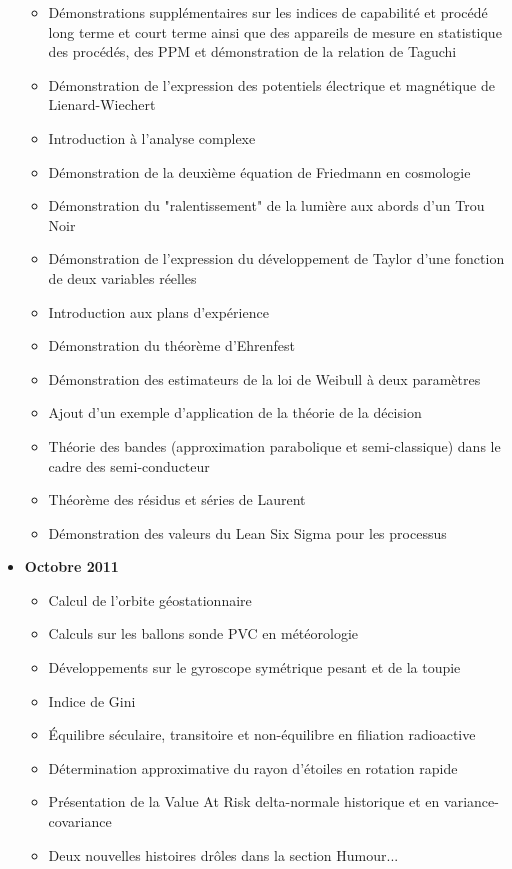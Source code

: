\documentclass[12pt,a4paper,twoside,openright]{report}
\theoremstyle{definition}
\theoremstyle{itexmp}
\numberwithin{equation}{section}
\begin{document}
\begin{itemize}
\begin{itemize}[noitemsep]
				\item Démonstrations supplémentaires sur les indices de capabilité et procédé long terme et court terme ainsi que des appareils de mesure en statistique des procédés, des PPM et démonstration de la relation de Taguchi
				\item Démonstration de l'expression des potentiels électrique et magnétique de Lienard-Wiechert
				\item Introduction à l'analyse complexe
				\item Démonstration de la deuxième équation de Friedmann en cosmologie
				\item Démonstration du "ralentissement" de la lumière aux abords d'un Trou Noir
				\item Démonstration de l'expression du développement de Taylor d'une fonction de deux variables réelles
				\item Introduction aux plans d'expérience
				\item Démonstration du théorème d'Ehrenfest
				\item Démonstration des estimateurs de la loi de Weibull à deux paramètres
				\item Ajout d'un exemple d'application de la théorie de la décision
				\item Théorie des bandes (approximation parabolique et semi-classique) dans le cadre des semi-conducteur
				\item Théorème des résidus et séries de Laurent
				\item Démonstration des valeurs du Lean Six Sigma pour les processus
			\end{itemize}
		\item \textbf{Octobre 2011}
			\begin{itemize}[noitemsep]
				\item Calcul de l'orbite géostationnaire
				\item Calculs sur les ballons sonde PVC en météorologie
				\item Développements sur le gyroscope symétrique pesant et de la toupie
				\item Indice de Gini
				\item Équilibre séculaire, transitoire et non-équilibre en filiation radioactive
				\item Détermination approximative du rayon d'étoiles en rotation rapide
				\item Présentation de la Value At Risk delta-normale historique et en variance-covariance
				\item Deux nouvelles histoires drôles dans la section Humour...

\end{itemize}
\end{itemize}
\end{document}
